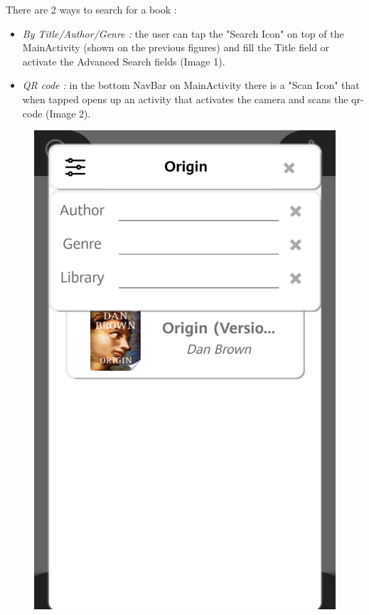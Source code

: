 \newpage
{}
There are 2 ways to search for a book :
\begin{itemize}
	\item \emph{By Title/Author/Genre :} the user can tap the "Search Icon" on top of the MainActivity (shown on the previous figures) and fill the Title field or activate the Advanced Search fields (Image 1).
	\item \emph{QR code :} in the bottom NavBar on MainActivity there is a "Scan Icon" that when tapped opens up an activity that activates the camera and scans the qr-code (Image 2).
\end{itemize}
\begin{figure}[H]
	\centering
	\includegraphics[scale=0.15]{Images/UI/Search/1}

\end{figure}
